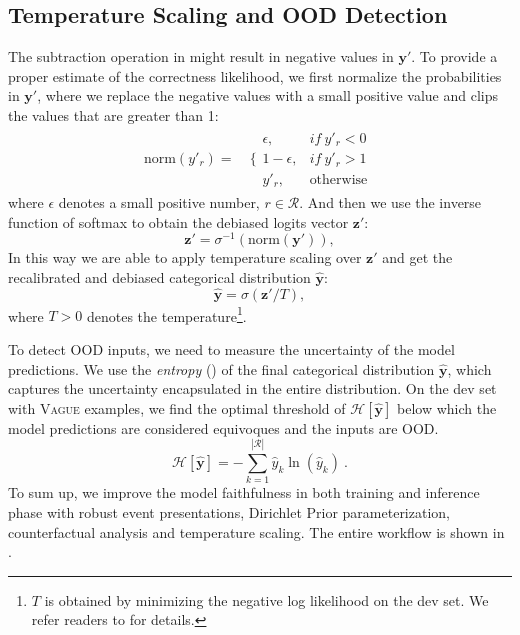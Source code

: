 \documentclass[11pt]{article}
\newcommand{\zb}{\mathbf{z}}
\newcommand{\yb}{\mathbf{y}}
\begin{document}
\subsection{Temperature Scaling and OOD Detection}
\label{sec:ts}
The subtraction operation in  might result in negative values in $\yb'$. 
To provide a proper estimate of the correctness likelihood, we first normalize the probabilities in $\yb'$, where we replace the negative values with a small positive value and clips the values that are greater than 1:
\begin{equation}
\begin{aligned}
\text{norm}(y'_r) = &\ \Big\{ 
\begin{array}{ll} 
\epsilon, & if\ y'_r < 0\\
1-\epsilon,  & if\ y'_r > 1\\
y'_r, & \text{otherwise}
\end{array}~\label{eqn:norm} 
\end{aligned}
\end{equation}
where $\epsilon$ denotes a small positive number, $r \in \mathcal{R}$.
And then we use the inverse function of softmax to obtain the debiased logits vector $\zb'$:
\begin{equation}\label{eq:inverse_softmax}
    \zb' = \sigma^{-1}(\text{norm}(\yb')),
\end{equation}
In this way we are able to apply temperature scaling \cite{pmlr-v70-guo17a} over $\zb'$ and get the recalibrated and debiased categorical distribution $\hat{\yb}$: 
\begin{equation}\label{eq:temperature}
    \hat{\yb} = \sigma(\zb'/T),
\end{equation}
where $T>0$ denotes the temperature\footnote{$T$ is obtained by minimizing the negative log likelihood on the dev set. We refer readers to  for details.}.

To detect OOD inputs, we need to measure the uncertainty of the model predictions.
We use the \emph{entropy} () of the final categorical distribution $\hat{\yb}$, which captures the uncertainty encapsulated in the entire distribution.
On the dev set with \textsc{Vague} examples, we find the optimal threshold of $\mathcal{H}[\hat{\yb}]$ below which the model predictions are considered equivoques and the inputs are OOD.
\begin{equation}
\label{eqn:um-entropy}
    \mathcal{H}[\hat{\yb}] = -\sum_{k=1}^{|\mathcal{R}|} \hat{y}_k  \ln(\hat{y}_k) \ .
\end{equation}
\noindent
To sum up, we improve the model faithfulness in both training and inference phase with robust event presentations, Dirichlet Prior parameterization, counterfactual analysis and temperature scaling.
The entire workflow is shown in .
\end{document}
